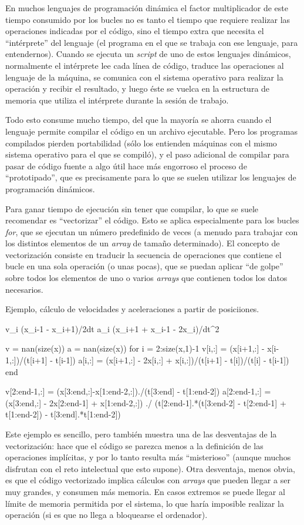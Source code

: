 ﻿\documentclass[spanish]{article}
\begin{document}
En muchos lenguajes de programación dinámica
el factor multiplicador de este tiempo consumido por los bucles no
es tanto el tiempo que requiere realizar las operaciones indicadas por
el código, sino el tiempo extra que necesita el ``intérprete'' del lenguaje
(el programa en el que se trabaja con ese lenguaje, para entendernos).
Cuando se ejecuta un \emph{script} de uno de estos lenguajes dinámicos,
normalmente el intérprete lee cada línea de código, traduce las operaciones al
lenguaje de la máquina, se comunica con el sistema operativo para
realizar la operación y recibir el resultado, y luego éste se vuelca en la
estructura de memoria que utiliza el intérprete durante la sesión de trabajo.

Todo esto consume mucho tiempo, del que la mayoría se ahorra cuando el lenguaje
permite compilar el código en un archivo ejecutable. Pero los programas
compilados pierden portabilidad (sólo los entienden máquinas con el
mismo sistema operativo para el que se compiló), y el paso adicional
de compilar para pasar de código fuente a algo útil hace más engorroso
el proceso de ``prototipado'', que es precisamente para lo que se suelen
utilizar los lenguajes de programación dinámicos.

Para ganar tiempo de ejecución sin tener que compilar, lo que se suele
recomendar es ``vectorizar'' el código. Esto se aplica especialmente para
los bucles \emph{for}, que se ejecutan un número predefinido de veces
(a menudo para trabajar con los distintos elementos de un \emph{array}
de tamaño determinado). El concepto de vectorización consiste en
traducir la secuencia de operaciones que contiene el bucle en una sola
operación (o unas pocas), que se puedan aplicar ``de golpe'' sobre todos los 
elementos de uno o varios \emph{arrays} que contienen todos los datos
necesarios.

Ejemplo, cálculo de velocidades y aceleraciones a partir de posiciiones.

v_i \approx (x_{i-1} - x_{i+1})/2dt
a_i \approx (x_i+1 + x_i-1 - 2x_i)/dt^2


v = nan(size(x))
a = nan(size(x))
for i = 2:size(x,1)-1
  v[i,:] = (x[i+1,:] - x[i-1,:])/(t[i+1] - t[i-1])
  a[i,:] = (x[i+1,:] - 2x[i,:] + x[i,:])/(t[i+1] - t[i])/(t[i] - t[i-1])
end

v[2:end-1,:] = (x[3:end,:]-x[1:end-2,:])./(t[3:end] - t[1:end-2])
a[2:end-1,:] = (x[3:end,:] - 2x[2:end-1] + x[1:end-2,:]) ./
  (t[2:end-1].*(t[3:end-2] - t[2:end-1] + t[1:end-2]) - t[3:end].*t[1:end-2])

Este ejemplo es sencillo, pero también muestra una de las desventajas de
la vectorización: hace que el código se parezca menos a la definición
de las operaciones implícitas, y por lo tanto resulta más ``misterioso''
(aunque muchos disfrutan con el reto intelectual que esto supone).
Otra desventaja, menos obvia, es que el código vectorizado implica
cálculos con \emph{arrays} que pueden llegar a ser muy grandes, y
consumen más memoria. En casos extremos se puede llegar al límite
de memoria permitida por el sistema, lo que haría imposible
realizar la operación (si es que no llega a bloquearse el ordenador).
\end{document}
